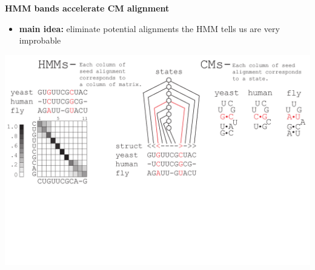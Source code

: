 \documentclass[landscape]{slides}
\begin{document}
\begin{slide}
\begin{minipage}{4in}
\begin{center}
\end{center}
\vspace{1.5in}
\end{minipage}
\end{slide}
\begin{slide}
\begin{center}

\textbf{HMM bands accelerate CM alignment}
\end{center}
\medskip
\small
\begin{itemize}
\item
\textbf{main idea:} eliminate potential alignments the HMM tells us are very improbable
\end{itemize}
\begin{center}
\includegraphics[width=8in]{figs/post_hmm_to_cm_map2_layer10}
\end{center}
\vfill
\end{slide}
\end{document}
